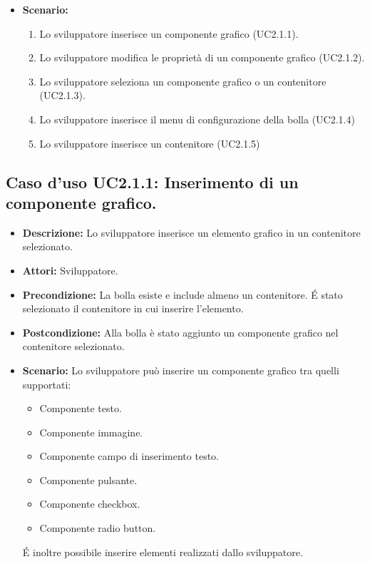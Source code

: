 \begin{itemize}
\item[]\textbf{Scenario:}
\begin{enumerate}
\item Lo sviluppatore inserisce un componente grafico (UC2.1.1).
\item Lo sviluppatore modifica le proprietà di un componente grafico (UC2.1.2).
\item Lo sviluppatore seleziona un componente grafico o un contenitore (UC2.1.3).
\item Lo sviluppatore inserisce il menu di configurazione della bolla (UC2.1.4)
\item Lo sviluppatore inserisce un contenitore (UC2.1.5)
\end{enumerate}
 
\end{itemize}

\subsection{Caso d'uso UC2.1.1: Inserimento di un componente grafico.}
\begin{itemize}
\item[]\textbf{Descrizione:} Lo sviluppatore inserisce un elemento grafico in un contenitore selezionato.
\item[]\textbf{Attori:} Sviluppatore. 
\item[]\textbf{Precondizione:} La bolla esiste e include almeno un contenitore. \'E stato selezionato il contenitore in cui inserire l'elemento. 
\item[]\textbf{Postcondizione:} Alla bolla è stato aggiunto un componente grafico nel contenitore selezionato. 
\item[]\textbf{Scenario:}
 Lo sviluppatore può inserire un componente grafico tra quelli supportati: \begin{itemize}
\item Componente testo.
\item Componente immagine.
\item Componente campo di inserimento testo.
\item Componente pulsante.
\item Componente checkbox.
\item Componente radio button. \end{itemize} \'E inoltre possibile inserire elementi realizzati dallo sviluppatore. 
\end{itemize}

\clearpage

